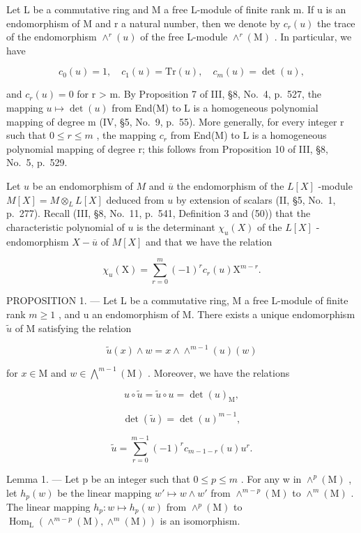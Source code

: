 Let L be a commutative ring and M a free L-module of finite rank m. If u is an endomorphism of M and r a natural number, then we denote by \(c_{r}(u)\) the trace of the endomorphism \(\wedge^{r}(u)\) of the free L-module \(\wedge^{r}(\mathrm{M})\) . In particular, we have

\[
c _ {0} (u) = 1, \quad c _ {1} (u) = \mathrm{Tr} (u), \quad c _ {m} (u) = \det (u),\tag{1}
\]

and \(c_{r}(u) = 0\) for r \textgreater{} m. By Proposition 7 of III, §8, No.~4, p.~527, the mapping \(u \mapsto \det(u)\) from End(M) to L is a homogeneous polynomial mapping of degree m (IV, §5, No.~9, p.~55). More generally, for every integer r such that \(0 \leqslant r \leqslant m\) , the mapping \(c_{r}\) from End(M) to L is a homogeneous polynomial mapping of degree r; this follows from Proposition 10 of III, §8, No.~5, p.~529.

Let \(u\) be an endomorphism of \(M\) and \(\overline{u}\) the endomorphism of the \(L[X]\) -module \(M[X] = M \otimes_{L} L[X]\) deduced from \(u\) by extension of scalars (II, §5, No.~1, p.~277). Recall (III, §8, No.~11, p.~541, Definition 3 and (50)) that the characteristic polynomial of \(u\) is the determinant \(\chi_u(X)\) of the \(L[X]\) -endomorphism \(X - \overline{u}\) of \(M[X]\) and that we have the relation

\[
\chi_ {u} (\mathrm{X}) = \sum_ {r = 0} ^ {m} (- 1) ^ {r} c _ {r} (u) \mathrm{X} ^ {m - r}.\tag{2}
\]

PROPOSITION 1. --- Let L be a commutative ring, M a free L-module of finite rank \(m \geqslant 1\) , and u an endomorphism of M. There exists a unique endomorphism \(\widetilde{u}\) of M satisfying the relation

\[
\widetilde {u} (x) \wedge w = x \wedge \wedge^ {m - 1} (u) (w)\tag{3}
\]

for \(x\in \mathrm{M}\) and \(w\in \bigwedge^{m - 1}(\mathrm{M})\) . Moreover, we have the relations

\[
u \circ \widetilde {u} = \widetilde {u} \circ u = \det (u) _ {\mathrm{M}},\tag{4}
\]

\[
\det (\widetilde {u}) = \det (u) ^ {m - 1},\tag{5}
\]

\[
\widetilde {u} = \sum_ {r = 0} ^ {m - 1} (- 1) ^ {r} c _ {m - 1 - r} (u) u ^ {r}.\tag{6}
\]

Lemma 1. --- Let p be an integer such that \(0 \leqslant p \leqslant m\) . For any w in \(\wedge^{p}(\mathrm{M})\) , let \(h_{p}(w)\) be the linear mapping \(w' \mapsto w \wedge w'\) from \(\wedge^{m-p}(\mathrm{M})\) to \(\wedge^{m}(\mathrm{M})\) . The linear mapping \(h_{p}: w \mapsto h_{p}(w)\) from \(\wedge^{p}(\mathrm{M})\) to \(\operatorname{Hom}_{\mathrm{L}}(\wedge^{m-p}(\mathrm{M}), \wedge^{m}(\mathrm{M}))\) is an isomorphism.

